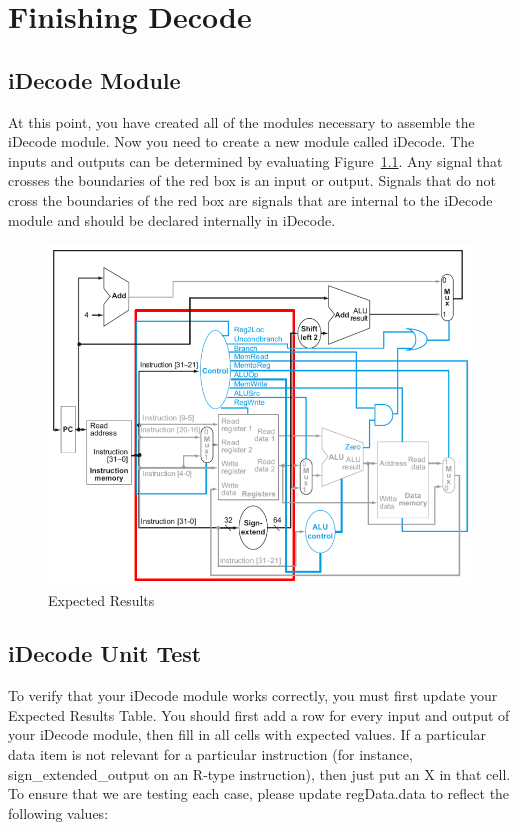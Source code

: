 \chapter{Finishing Decode}

\section{iDecode Module}
At this point, you have created all of the modules necessary to assemble the iDecode module.  Now you need to create a new module called iDecode.  The inputs and outputs can be determined by evaluating Figure~\ref{fig:decode_stage}.  Any signal that crosses the boundaries of the red box is an input or output.  Signals that do not cross the boundaries of the red box are signals that are internal to the iDecode module and should be declared internally in iDecode.

\begin{figure}
	\caption{Expected Results}\label{fig:decode_stage}
	\begin{center}
		\includegraphics[width=4.75in]{../images/decode_stage.png}
	\end{center}
\end{figure} 


\section{iDecode Unit Test}
To verify that your iDecode module works correctly, you must first update your Expected Results Table. You should first add a row for every input and output of your iDecode module, then fill in all cells with expected values.  If a particular data item is not relevant for a particular instruction (for instance, sign\_extended\_output on an R-type instruction), then just put an X in that cell.  To ensure that we are testing each case, please update regData.data to reflect the following values:

